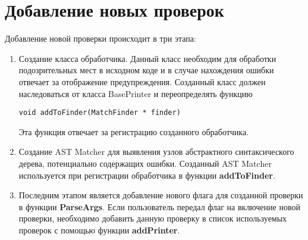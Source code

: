 \section{Добавление новых проверок}
Добавление новой проверки происходит в три этапа:
\begin{enumerate}
	\item Создание класса обработчика. Данный класс необходим для обработки подозрительных мест
в исходном коде и в случае нахождения ошибки отвечает за отображение предупреждения. Созданный класс
должен наследоваться от класса BasePrinter и переопределять функцию
\begin{lstlisting}
void addToFinder(MatchFinder * finder)
\end{lstlisting} 
Эта функция отвечает за регистрацию созданного обработчика.
	\item Создание AST Matcher для выявления узлов абстрактного синтаксического дерева, потенциально 
содержащих ошибки. Созданный AST Matcher используется при регистрации обработчика в функции 
\textbf{addToFinder}.
	\item Последним этапом является добавление нового флага для созданной проверки в функции 
\textbf{ParseArgs}. Если пользователь передал флаг на включение новой проверки, необходимо
добавить данную проверку в список используемых проверок с помощью функции \textbf{addPrinter}.
\end{enumerate}

